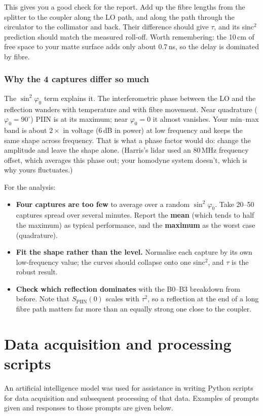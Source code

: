 \begin{tcolorbox}[breakable, colback=gray!4, colframe=gray!50,
	boxrule=0.4pt, arc=2pt, fontupper=\small,
	left=6pt, right=6pt, top=4pt, bottom=4pt]
	This gives you a good check for the report. Add up the fibre lengths from the splitter to the coupler along the LO path, and along the path through the circulator to the collimator and back. Their difference should give $\tau$, and its sinc$^2$ prediction should match the measured roll-off. Worth remembering: the 10\,cm of free space to your matte surface adds only about 0.7\,ns, so the delay is dominated by fibre.
	
	\subsubsection*{Why the 4 captures differ so much}
	The $\sin^2\varphi_0$ term explains it. The interferometric phase between the LO and the reflection wanders with temperature and with fibre movement. Near quadrature ($\varphi_0 = 90^\circ$) PIIN is at its maximum; near $\varphi_0 = 0$ it almost vanishes. Your min--max band is about $2\times$ in voltage (6\,dB in power) at low frequency and keeps the same shape across frequency. That is what a phase factor would do: change the amplitude and leave the shape alone. (Harris's lidar used an 80\,MHz frequency offset, which averages this phase out; your homodyne system doesn't, which is why yours fluctuates.)
	
	For the analysis:
	\begin{itemize}
		\item \textbf{Four captures are too few} to average over a random $\sin^2\varphi_0$. Take 20--50 captures spread over several minutes. Report the \textbf{mean} (which tends to half the maximum) as typical performance, and the \textbf{maximum} as the worst case (quadrature).
		\item \textbf{Fit the shape rather than the level.} Normalise each capture by its own low-frequency value; the curves should collapse onto one sinc$^2$, and $\tau$ is the robust result.
		\item \textbf{Check which reflection dominates} with the B0--B3 breakdown from before. Note that $S_{\mathrm{PIIN}}(0)$ scales with $\tau^2$, so a reflection at the end of a long fibre path matters far more than an equally strong one close to the coupler.
	\end{itemize}
\end{tcolorbox}
 
 \section{Data acquisition and processing scripts}
 An artificial intelligence model was used for assistance in writing Python scripts for data acquisition and subsequent processing of that data. Examples of prompts given and responses to those prompts are given below.
 
